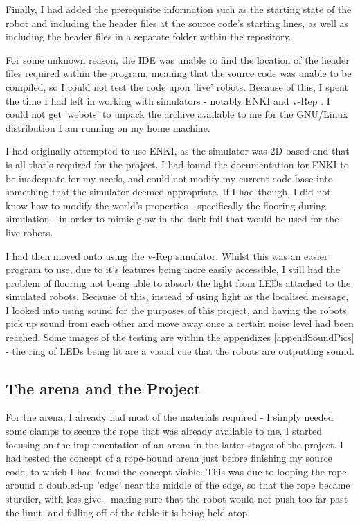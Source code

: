 Finally, I had added the prerequisite information such as the starting state
of the robot and including the header files at the source code's starting
lines, as well as including the header files in a separate folder within the
repository.

For some unknown reason, the IDE was unable to find the location of the header
files required within the program, meaning that the source code was unable to
be compiled, so I could not test the code upon 'live' robots.  Because of this,
I spent the time I had left in working with simulators - notably ENKI and
v-Rep \cite{enkiSite,vRepSite}.  I could not get 'webots'
\cite{webotsSite} to unpack the archive available to me for the GNU/Linux
distribution I am running on my home machine.

I had originally attempted to use ENKI, as the simulator was 2D-based and that
is all that's required for the project.  I had found the documentation for ENKI
to be inadequate for my needs, and could not modify my current code base into
something that the simulator deemed appropriate.  If I had though, I did not
know how to modify the world's properties - specifically the flooring during
simulation - in order to mimic glow in the dark foil that would be used for the
live robots.

I had then moved onto using the v-Rep simulator.  Whilst this was an easier
program to use, due to it's features being more easily accessible, I still had
the problem of flooring not being able to absorb the light from LEDs attached
to the simulated robots.  Because of this, instead of using light as the
localised message, I looked into using sound for the purposes of this project,
and having the robots pick up sound from each other and move away once a
certain noise level had been reached.  Some images of the testing are within
the appendixes \ref{appendSoundPics} - the ring of LEDs being lit are a visual
cue that the robots are outputting sound.

\subsection{The arena and the Project}
For the arena, I already had most of the materials required - I simply needed
some clamps to secure the rope that was already available to me.  I started
focusing on the implementation of an arena in the latter stages of the project.
I had tested the concept of a rope-bound arena just before finishing my source
code, to which I had found the concept viable.  This was due to looping the
rope around a doubled-up 'edge' near the middle of the edge, so that the rope
became sturdier, with less give - making sure that the robot would not push too
far past the limit, and falling off of the table it is being held atop.

